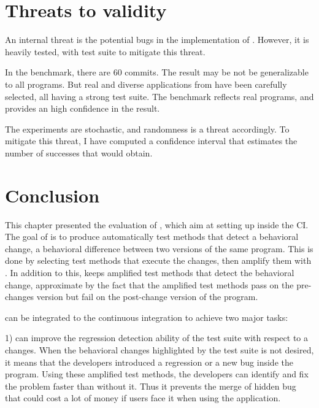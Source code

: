\section{Threats to validity}
\label{sec:dci:threats}

An internal threat is the potential bugs in the implementation of \DCI.
However, it is heavily tested, with \junit test suite to mitigate this threat.

In the benchmark, there are 60 commits. 
The result may be not be generalizable to all programs. 
But real and diverse applications from \gh have been carefully selected, all having a strong test suite. 
The benchmark reflects real programs, and provides an high confidence in the result.

The experiments are stochastic, and randomness is a threat accordingly.
To mitigate this threat, I have computed a confidence interval that estimates the number of successes that \DCI would obtain.

\section{Conclusion}
\label{sec:dci:conclusion}

This chapter presented the evaluation of \DCI, which aim at setting up \dspot inside the CI.
The goal of \DCI is to produce automatically test methods that detect a behavioral change, \ie a behavioral difference between two versions of the same program.
This is done by selecting test methods that execute the changes, then amplify them with \dspot.
In addition to this, \dspot keeps amplified test methods that detect the behavioral change, approximate by the fact that the amplified test methods pass on the pre-changes version but fail on the post-change version of the program.

\DCI can be integrated to the continuous integration to achieve two major tasks:

1) \DCI can improve the regression detection ability of the test suite with respect to a changes.
When the behavioral changes highlighted by the test suite is not desired, it means that the developers introduced a regression or a new bug inside the program.
Using these amplified test methods, the developers can identify and fix the problem faster than without it.
Thus it prevents the merge of hidden bug that could cost a lot of money if users face it when using the application.

